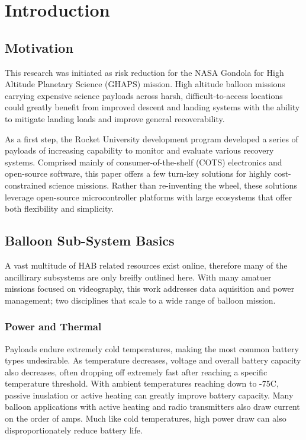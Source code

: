 \documentclass[heading.tex]{subfiles}
\begin{document}

\section{Introduction}
\subsection{Motivation}
This research was initiated as risk reduction for the NASA
Gondola for High Altitude Planetary Science (GHAPS) mission.
High altitude balloon missions carrying expensive science payloads
across harsh, difficult-to-access locations could greatly benefit from
improved descent and landing systems with the ability to mitigate landing
loads and improve general recoverability.

As a first step, the Rocket University development program developed a series
of payloads of increasing capability to monitor and evaluate various recovery
systems. Comprised mainly of consumer-of-the-shelf (COTS) electronics and
open-source software, this paper offers a few turn-key solutions for highly
cost-constrained science missions. Rather than re-inventing the wheel, these
solutions leverage open-source microcontroller platforms with large ecosystems
that offer both flexibility and simplicity.


\subsection{Balloon Sub-System Basics}

A vast multitude of HAB related resources exist online, therefore many of the
ancillirary subsystems are only breifly outlined here. With many amatuer missions
focused on videography, this work addresses data aquisition and power management;
two disciplines that scale to a wide range of balloon mission.

\subsubsection{Power and Thermal}

Payloads endure extremely cold temperatures, making the most common battery
types undesirable. As temperature decreases, voltage and overall battery
capacity also decreases, often dropping off extremely fast after reaching a specific
temperature threshold. With ambient temperatures reaching down to -75\degree C,
passive inuslation or active heating can greatly improve battery capacity.
Many balloon applications with active heating and radio transmitters also draw
current on the order of amps. Much like cold temperatures, high power draw can
also disproportionately reduce battery life. 
\end{document}
